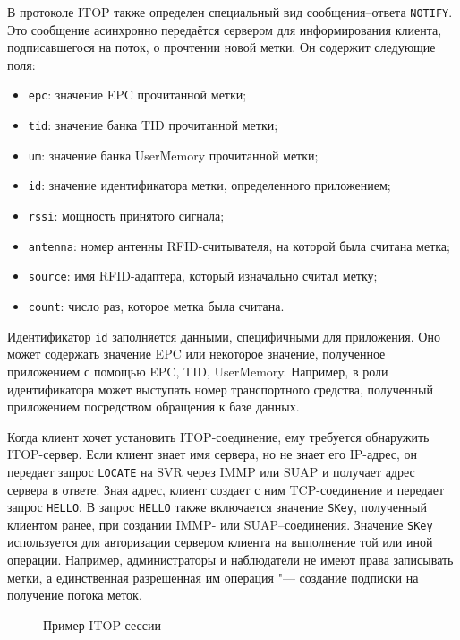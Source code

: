 В протоколе ITOP также определен специальный вид сообщения--ответа \texttt{NOTIFY}. Это сообщение асинхронно передаётся сервером для информирования клиента, подписавшегося на поток, о прочтении новой метки. Он содержит следующие поля:

\begin{itemize}
	\item \texttt{epc}: значение EPC прочитанной метки;
	\item \texttt{tid}: значение банка TID прочитанной метки;
	\item \texttt{um}: значение банка UserMemory прочитанной метки;
	\item \texttt{id}: значение идентификатора метки, определенного приложением;
	\item \texttt{rssi}: мощность принятого сигнала;
	\item \texttt{antenna}: номер антенны RFID-считывателя, на которой была считана метка;
	\item \texttt{source}: имя RFID-адаптера, который изначально считал метку;
	\item \texttt{count}: число раз, которое метка была считана.
\end{itemize}

Идентификатор \texttt{id} заполняется данными, специфичными для приложения. Оно может содержать значение EPC или некоторое значение, полученное приложением с помощью EPC, TID, UserMemory. Например, в роли идентификатора может выступать номер транспортного средства, полученный приложением посредством обращения к базе данных.

Когда клиент хочет установить ITOP-соединение, ему требуется обнаружить ITOP-сервер. Если клиент знает имя сервера, но не знает его IP-адрес, он передает запрос \texttt{LOCATE} на SVR через IMMP или SUAP и получает адрес сервера в ответе. Зная адрес, клиент создает с ним TCP-соединение и передает запрос \texttt{HELLO}. В запрос \texttt{HELLO} также включается значение \texttt{SKey}, полученный клиентом ранее, при создании IMMP- или SUAP--соединения. Значение \texttt{SKey} используется для авторизации сервером клиента на выполнение той или иной операции. Например, администраторы и наблюдатели не имеют права записывать метки, а единственная разрешенная им операция "--- создание подписки на получение потока меток.

\begin{figure}[ht] 
  \caption{Пример ITOP-сессии}
  \label{fig:ch5_itop_session}
\end{figure}

